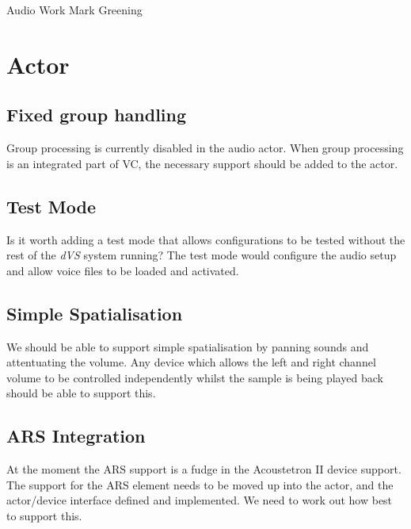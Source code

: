 \documentclass{article}
\begin{document}
 
        {Audio Work} 
        {Mark Greening}


\section*{Actor}
\subsection*{Fixed group handling}
Group processing is currently disabled in the audio actor. 
When group processing is an integrated part of VC, the necessary
support should be added to the actor.
\subsection*{Test Mode}
Is it worth adding a test mode that allows configurations to be tested
without the rest of the {\em dVS} system running?  
The test mode would configure the audio setup and allow voice files to
be loaded and activated.
\subsection*{Simple Spatialisation}
We should be able to support simple spatialisation by panning sounds
and attentuating the volume.
Any device which allows the left and right channel volume to be
controlled independently whilst the sample is being played back should
be able to support this. 
\subsection*{ARS Integration}
At the moment the ARS support is a fudge in the Acoustetron II device
support. 
The support for the ARS element needs to be moved up into the actor,
and the actor/device interface defined and implemented. 
We need to work out how best to support this.
\end{document}
